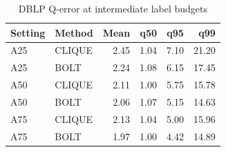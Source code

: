 \begin{table}[H]
\centering
\small
\setlength{\tabcolsep}{5pt}
\caption{DBLP Q-error at intermediate label budgets}
\label{tab:supplement-DBLP}
\begin{tabular}{@{}llrrrr@{}}
\toprule
Setting & Method & Mean & q50 & q95 & q99 \\
\midrule
A25 & CLIQUE & 2.45 & 1.04 & 7.10 & 21.20 \\
A25 & BOLT & 2.24 & 1.08 & 6.15 & 17.45 \\
A50 & CLIQUE & 2.11 & 1.00 & 5.75 & 15.78 \\
A50 & BOLT & 2.06 & 1.07 & 5.15 & 14.63 \\
A75 & CLIQUE & 2.13 & 1.04 & 5.00 & 15.96 \\
A75 & BOLT & 1.97 & 1.00 & 4.42 & 14.89 \\
\bottomrule
\end{tabular}
\end{table}
